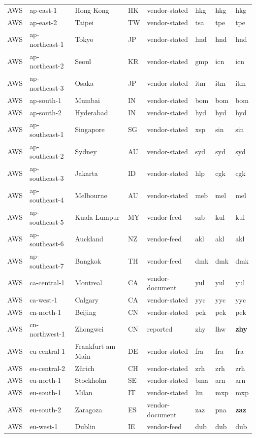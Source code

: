 \begin{longtable}{llllllll}
AWS & ap-east-1 & Hong Kong & HK & vendor-stated & hkg & hkg & hkg \\
AWS & ap-east-2 & Taipei & TW & vendor-stated & tsa & tpe & tpe \\
AWS & ap-northeast-1 & Tokyo & JP & vendor-stated & hnd & hnd & hnd \\
AWS & ap-northeast-2 & Seoul & KR & vendor-stated & gmp & icn & icn \\
AWS & ap-northeast-3 & Osaka & JP & vendor-stated & itm & itm & itm \\
AWS & ap-south-1 & Mumbai & IN & vendor-stated & bom & bom & bom \\
AWS & ap-south-2 & Hyderabad & IN & vendor-stated & hyd & hyd & hyd \\
AWS & ap-southeast-1 & Singapore & SG & vendor-stated & xsp & sin & sin \\
AWS & ap-southeast-2 & Sydney & AU & vendor-stated & syd & syd & syd \\
AWS & ap-southeast-3 & Jakarta & ID & vendor-stated & hlp & cgk & cgk \\
AWS & ap-southeast-4 & Melbourne & AU & vendor-stated & meb & mel & mel \\
AWS & ap-southeast-5 & Kuala Lumpur & MY & vendor-feed & szb & kul & kul \\
AWS & ap-southeast-6 & Auckland & NZ & vendor-feed & akl & akl & akl \\
AWS & ap-southeast-7 & Bangkok & TH & vendor-feed & dmk & dmk & dmk \\
AWS & ca-central-1 & Montreal & CA & vendor-document & yul & yul & yul \\
AWS & ca-west-1 & Calgary & CA & vendor-stated & yyc & yyc & yyc \\
AWS & cn-north-1 & Beijing & CN & vendor-stated & pek & pek & pek \\
AWS & cn-northwest-1 & Zhongwei & CN & reported & zhy & lhw & \textbf{zhy} \\
AWS & eu-central-1 & Frankfurt am Main & DE & vendor-stated & fra & fra & fra \\
AWS & eu-central-2 & Zürich & CH & vendor-stated & zrh & zrh & zrh \\
AWS & eu-north-1 & Stockholm & SE & vendor-stated & bma & arn & arn \\
AWS & eu-south-1 & Milan & IT & vendor-stated & lin & mxp & mxp \\
AWS & eu-south-2 & Zaragoza & ES & vendor-document & zaz & pna & \textbf{zaz} \\
AWS & eu-west-1 & Dublin & IE & vendor-feed & dub & dub & dub \\

\end{longtable}
